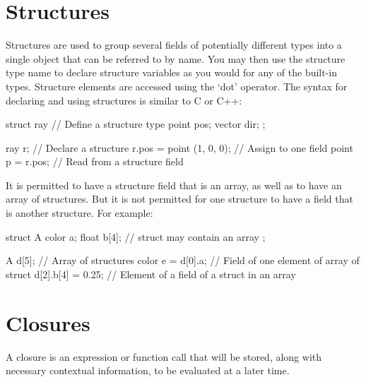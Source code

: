 \documentclass[11pt,letterpaper]{book}
\def\closure{{\cf closure}\xspace}
\begin{document}
\section{Structures}
\label{sec:types:struct}
  

Structures are used to group several fields of potentially different
types into a single object that can be referred to by name.  You may
then use the structure type name to declare structure variables as you
would for any of the built-in types.  Structure elements are accessed
using the `dot' operator.  The syntax for declaring and using structures
is similar to C or C++:

\begin{code}
    struct ray {                   // Define a structure type
        point pos;
        vector dir;
    };

    ray r;                         // Declare a structure
    r.pos = point (1, 0, 0);       // Assign to one field
    point p = r.pos;               // Read from a structure field
\end{code}

It is permitted to have a structure field that is an array, as well as
to have an array of structures.  But it is not permitted for one
structure to have a field that is another structure.  For example:

\begin{code}
    struct A {
        color a;
        float b[4];       // struct may contain an array
    };

    A d[5];               // Array of structures
    color e = d[0].a;     // Field of one element of array of struct
    d[2].b[4] = 0.25;     // Element of a field of a struct in an array
\end{code}




\section{Closures}
\label{sec:types:closures}

A \closure is an expression or function call that will be stored, along
with necessary contextual information, to be evaluated at a later time.
\end{document}
